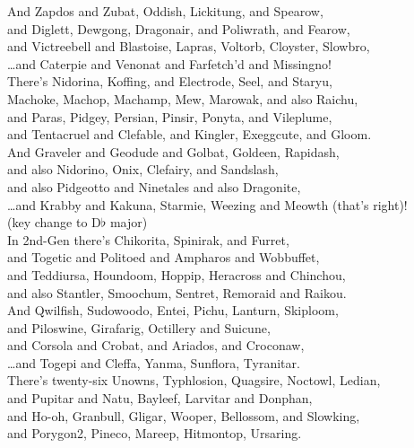 \documentclass{amsart}
\begin{document}
And Zapdos and Zubat, Oddish, Lickitung, and Spearow,\\
and Diglett, Dewgong, Dragonair, and Poliwrath, and Fearow,\\
and Victreebell and Blastoise, Lapras, Voltorb, Cloyster, Slowbro,\\
\dots and Caterpie and Venonat and Farfetch'd and Missingno!\\

There's Nidorina, Koffing, and Electrode, Seel, and Staryu,\\
Machoke, Machop, Machamp, Mew, Marowak, and also Raichu,\\
and Paras, Pidgey, Persian, Pinsir, Ponyta, and Vileplume,\\
and Tentacruel and Clefable, and Kingler, Exeggcute, and Gloom.\\

And Graveler and Geodude and Golbat, Goldeen, Rapidash,\\
and also Nidorino, Onix, Clefairy, and Sandslash,\\
and also Pidgeotto and Ninetales and also Dragonite,\\
\dots and Krabby and Kakuna, Starmie, Weezing and Meowth (that's right)!\\


(key change to D$\flat$ major)\\

In 2nd-Gen there's Chikorita, Spinirak, and Furret,\\
and Togetic and Politoed and Ampharos and Wobbuffet,\\
and Teddiursa, Houndoom, Hoppip, Heracross and Chinchou,\\
and also Stantler, Smoochum, Sentret, Remoraid and Raikou.\\

And Qwilfish, Sudowoodo, Entei, Pichu, Lanturn, Skiploom,\\
and Piloswine, Girafarig, Octillery and Suicune,\\
and Corsola and Crobat, and Ariados, and Croconaw,\\
\dots and Togepi and Cleffa, Yanma, Sunflora, Tyranitar.\\

There's twenty-six Unowns, Typhlosion, Quagsire, Noctowl, Ledian,\\
and Pupitar and Natu, Bayleef, Larvitar and Donphan,\\
and Ho-oh, Granbull, Gligar, Wooper, Bellossom, and Slowking,\\
and Porygon2, Pineco, Mareep, Hitmontop, Ursaring.\\
\end{document}
